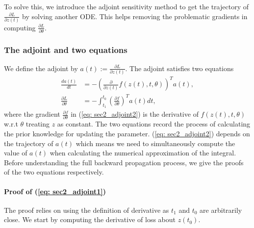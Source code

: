 To solve this, we introduce the adjoint sensitivity method to get the trajectory of $\frac{\partial L}{\partial z(t)}$ by solving another ODE. 
This helps removing the problematic gradients in computing $\frac{\partial L}{\partial \theta}$. 

\subsubsection{The adjoint and two equations}

We define the adjoint by $a(t):=\frac{\partial L}{\partial z(t)}$. 
The adjoint satisfies two equations 
\begin{align}
    \frac{da(t)}{dt} &= -\left(\frac{\partial}{\partial z(t)}f(z(t),t,\theta)\right)^Ta(t), \label{eq: sec2_adjoint1} \\
    \frac{\partial L}{\partial \theta} &= -\int_{t_1}^{t_0}\left(\frac{\partial f}{\partial \theta}\right)^Ta(t)dt,  \label{eq: sec2_adjoint2}
\end{align}
where the gradient $\frac{\partial f}{\partial \theta}$ in (\ref{eq: sec2_adjoint2}) is the derivative of $f(z(t),t,\theta)$ w.r.t $\theta$ treating $z$ as constant. 
The two equations record the process of calculating the prior knowledge for updating the parameter. 
(\ref{eq: sec2_adjoint2}) depends on the trajectory of $a(t)$ which means we need to simultaneously compute the value of $a(t)$ when calculating the numerical approximation of the integral. 
Before understanding the full backward propagation process, 
we give the proofs of the two equations respectively. 

\paragraph{Proof of (\ref{eq: sec2_adjoint1})}
The proof relies on using the definition of derivative as $t_1$ and $t_0$ are arbitrarily close. 
We start by computing the derivative of loss about $z(t_0)$. 

